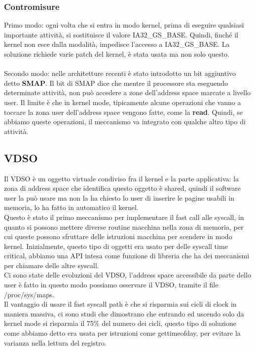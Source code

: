 \documentclass[12pt, oneside]{extbook}
\begin{document}
\subsubsection{Contromisure}
Primo modo: ogni volta che si entra in modo kernel, prima di eseguire qualsiasi importante attività, si sostituisce il valore IA32\_GS\_BASE. Quindi, finché il kernel non esce dalla modalità, impedisce l'accesso a IA32\_GS\_BASE. La soluzione richiede varie patch del kernel, è stata usata ma non solo questo.\\\\
Secondo modo: nelle architetture recenti è stato introdotto un bit aggiuntivo detto \textbf{SMAP}. Il bit di SMAP dice che mentre il processore sta eseguendo determinate attività, non può accedere a zone dell'address space marcate a livello user. Il limite è che in kernel mode, tipicamente alcune operazioni che vanno a toccare la zona user dell'address space vengono fatte, come la \textbf{read}. Quindi, se abbiamo queste operazioni, il meccanismo va integrato con qualche altro tipo di attività.
\subsection{VDSO}
Il VDSO è un oggetto virtuale condiviso fra il kernel e la parte applicativa: la zona di address space che identifica questo oggetto è shared, quindi il software user la può usare ma non la ha chiesto lo user di inserire le pagine usabili in memoria, lo ha fatto in automatico il kernel. \\ Questo è stato il primo meccanismo per implementare il fast call alle syscall, in quanto si possono mettere diverse routine macchina nella zona di memoria, per cui queste possono sfruttare delle istruzioni macchina per scendere in modo kernel. Inizialmente, questo tipo di oggetti era usato per delle syscall time critical, abbiamo una API intesa come funzione di libreria che ha dei meccanismi per chiamare delle altre syscall.\\ Ci sono state delle evoluzioni del VDSO, l'address space accessibile da parte dello user è fatto in questo modo
possiamo osservare il VDSO, tramite il file /proc/sys/maps.\\ Il vantaggio di usare il fast syscall path è che si risparmia sui cicli di clock in maniera massiva, ci sono studi che dimostrano che entrando ed uscendo solo da kernel mode si risparmia il 75\% del numero dei cicli, questo tipo di soluzione come abbiamo detto era usata per istruzioni come \textsf{gettimeofday}, per evitare la varianza nella lettura del registro.
\end{document}
